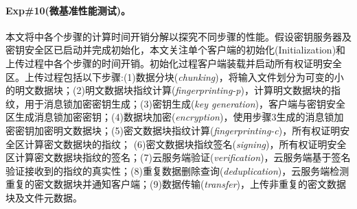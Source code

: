 \paragraph*{Exp\#10(微基准性能测试)。}本文将\sysnameS 中各个步骤的计算时间开销分解以探究不同步骤的性能。假设密钥服务器及密钥安全区已启动并完成初始化，本文关注单个客户端的初始化(Initialization)和上传过程中各个步骤的时间开销。初始化过程客户端装载并启动所有权证明安全区。上传过程包括以下步骤:(1)数据分块(\textit{chunking})，将输入文件划分为可变的小的明文数据块；(2)明文数据块指纹计算(\textit{fingerprinting-p})，计算明文数据块的指纹，用于消息锁加密密钥生成；(3)密钥生成(\textit{key generation})，客户端与密钥安全区生成消息锁加密密钥；(4)数据块加密(\textit{encryption})，使用步骤3生成的消息锁加密密钥加密明文数据块；(5)密文数据块指纹计算(\textit{fingerprinting-c})，所有权证明安全区计算密文数据块的指纹； (6)密文数据块指纹签名(\textit{signing})，所有权证明安全区计算密文数据块指纹的签名；(7)云服务端验证(\textit{verification})，云服务端基于签名验证接收到的指纹的真实性；(8)重复数据删除查询(\textit{deduplication})，云服务端检测重复的密文数据块并通知客户端；(9)数据传输(\textit{transfer})，上传非重复的密文数据块及文件元数据。

